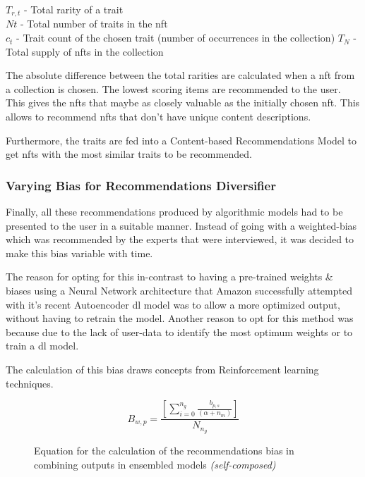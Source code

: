 \noindent$T_{r,t}$ - Total rarity of a trait\\
$Nt$ - Total number of traits in the \gls{nft}\\
$c_{t}$ - Trait count of the chosen trait (number of occurrences in the collection)
$T_{N}$ - Total supply of \gls{nft}s in the collection

The absolute difference between the total rarities are calculated when a \gls{nft} from a collection is chosen. The lowest scoring items are recommended to the user. This gives the \gls{nft}s that maybe as closely valuable as the initially chosen \gls{nft}. This allows to recommend \gls{nft}s that don't have unique content descriptions.

Furthermore, the traits are fed into a Content-based Recommendations Model to get \gls{nft}s with the most similar traits to be recommended.





\subsubsection{Varying Bias for Recommendations Diversifier}
Finally, all these recommendations produced by algorithmic models had to be presented to the user in a suitable manner. Instead of going with a weighted-bias which was recommended by the experts that were interviewed, it was decided to make this bias variable with time. 

The reason for opting for this in-contrast to having a pre-trained weights \& biases using a Neural Network architecture that Amazon successfully attempted with it's recent Autoencoder \autocite{larry_history_2019} \gls{dl} model was to allow a more optimized output, without having to retrain the model. Another reason to opt for this method was because due to the lack of user-data to identify the most optimum weights or to train a \gls{dl} model.

The calculation of this bias draws concepts from Reinforcement learning techniques.
\begin{figure}[h!]
\begin{equation}
B_{w,p} = \frac{\left[ \sum^{n_{g}}_{i=0} \frac{b_{p,s}}{\left( \alpha + n_{m} \right)} \right]}{N_{n_{g}}} 
\end{equation}
\caption*{Equation for the calculation of the recommendations bias in combining outputs in ensembled models \textit{(self-composed)}}
\end{figure}

